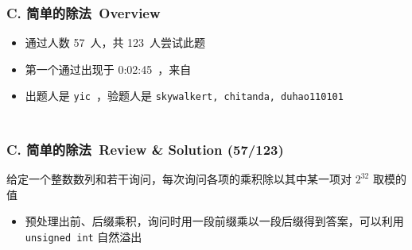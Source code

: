 \documentclass[notheorems]{beamer}
\newcommand{\zhProbC}{简单的除法}		\newcommand{\DiffC}{Very Easy}	\newcommand{\AuthProbC}{\texttt{yic}}			\newcommand{\TestProbC}{\texttt{skywalkert, chitanda, duhao110101}}
\newcommand{\AccInProbC}{57}	\newcommand{\SubInProbC}{123}	\newcommand{\RatInProbC}{46.34\%}
\newcommand{\FirPenInProbC}{0:02:45}		\newcommand{\FirPerInProbC}{\Someone}
\begin{document}
\begin{frame}[label = ProbC]
\frametitle{\\ C. \zhProbC\ Overview}
\begin{spacing}{2.0} \large
\begin{itemize}
\item 通过人数 \AccInProbC\ 人，共 \SubInProbC\ 人尝试此题
\item 第一个通过出现于 \FirPenInProbC\ ，来自 \FirPerInProbC\ 
\item 出题人是 \AuthProbC\ ，验题人是 \TestProbC\
\end{itemize}
\end{spacing}
\end{frame}
\begin{frame}
\frametitle{\\ C. \zhProbC\ Review \& Solution (\AccInProbC/\SubInProbC)}
\begin{spacing}{2.0} \large
给定一个整数数列和若干询问，每次询问各项的乘积除以其中某一项对 $2^{32}$ 取模的值 \pause
\begin{itemize}
\item 预处理出前、后缀乘积，询问时用一段前缀乘以一段后缀得到答案，可以利用 \texttt{unsigned int} 自然溢出
\end{itemize}
\end{spacing}
\end{frame}
\end{document}
